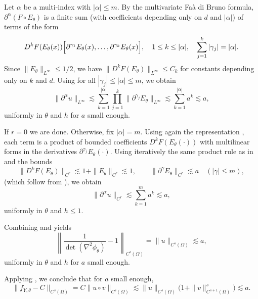 \documentclass{article}
\newcommand{\1}{\mathds{1}}
\theoremstyle{plain}
\theoremstyle{definition}
\theoremstyle{remark}
\begin{document}
Let $\alpha$ be a multi-index with $|\alpha|\le m$.
By the multivariate Fa\`a di Bruno formula, $\partial^\alpha(F\circ E_\theta)$ is a finite sum (with coefficients depending only on
$d$ and $|\alpha|$) of terms of the form
\begin{equation}
\label{eq:fdb_F_comp_E}
D^k F(E_\theta(x))\Bigl[\partial^{\gamma_1}E_\theta(x),\dots,\partial^{\gamma_k}E_\theta(x)\Bigr],
\quad
1\le k\le |\alpha|,
\quad
\sum_{j=1}^k |\gamma_j|=|\alpha|.
\end{equation}
Since $\|E_\theta\|_{L^\infty}\le 1/2$, we have $\|D^kF(E_\theta)\|_{L^\infty}\le C_k$ for constants depending only on $k$ and $d$.
Using  for all $|\gamma_j|\le|\alpha|\le m$, we obtain
\begin{equation}
\label{eq:integer_bound_u}
\|\partial^\alpha u\|_{L^\infty}
\lesssim
\sum_{k=1}^{|\alpha|}
\prod_{j=1}^k \|\partial^{\gamma_j}E_\theta\|_{L^\infty}
\lesssim
\sum_{k=1}^{|\alpha|} a^{k}
\lesssim a,
\end{equation}
uniformly in $\theta$ and $h$ for $a$ small enough.


If $r=0$ we are done. Otherwise, fix $|\alpha|=m$. Using again the representation , each term is a product of
bounded coefficients $D^kF(E_\theta(\cdot))$ with multilinear forms in the derivatives $\partial^{\gamma_j}E_\theta(\cdot)$.
Using iteratively the same product rule as in  and the bounds
\[
\|D^kF(E_\theta)\|_{C^{r}} \lesssim 1+\|E_\theta\|_{C^{r}}
\lesssim 1,
\qquad
\|\partial^{\gamma}E_\theta\|_{C^{r}}\lesssim a \quad (|\gamma|\le m),
\]
(which follow from ), we obtain
\begin{equation}
\label{eq:holder_bound_u}
\|\partial^\alpha u\|_{C^{r}}
\lesssim
\sum_{k=1}^{m} a^{k}
\lesssim a,
\end{equation}
uniformly in $\theta$ and $h\le 1$.

Combining  and  yields
\begin{equation}
    \left\| \frac{1}{\det(\nabla^2 \phi_\theta)} - 1 \right\|_{C^{s}(\Omega)}
=
\|u\|_{C^{s}(\Omega)}
\lesssim a,
\end{equation}
uniformly in $\theta$ and $h$ for $a$ small enough.

Applying , we conclude that for $a$ small enough,
\begin{equation}
    \| f_{Y,\theta} - C \|_{C^{s}(\Omega)}
=
C \bigl\| u \circ v \bigr\|_{C^{s}(\Omega)}
\lesssim
\|u\|_{C^{s}(\Omega)} \bigl(1+\|v\|_{C^{s+1}(\Omega)}^{s}\bigr)
\lesssim
a.
\end{equation}
\end{document}
